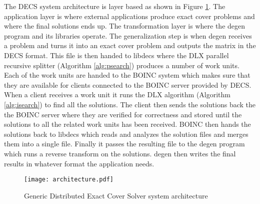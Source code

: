The DECS system architecture is layer based as shown in Figure \ref{fig:architecture}.
The application layer is where external applications produce exact cover problems and where the final solutions ends up.
The transformation layer is where the degen program and its libraries operate.
The generalization step is when degen receives a problem and turns it into an exact cover problem and outputs the matrix in the DECS format.
This file is then handed to libdecs where the DLX parallel recursive splitter (Algorithm \ref{alg:psearch}) produces a number of work units.
Each of the work units are handed to the BOINC system which makes sure that they are available for clients connected to the BOINC server provided by DECS.
When a client receives a work unit it runs the DLX algorithm (Algorithm \ref{alg:isearch}) to find all the solutions.
The client then sends the solutions back the the BOINC server where they are verified for correctness and stored until the solutions to all the related work units has been received.
BOINC then hands the solutions back to libdecs which reads and analyzes the solution files and merges them into a single file.
Finally it passes the resulting file to the degen program which runs a reverse transform on the solutions.
degen then writes the final results in whatever format the application needs.

\begin{figure}[htbp]
	\centering 
	\texttt{[image: architecture.pdf]}
	\caption{Generic Distributed Exact Cover Solver system architecture}
	\label{fig:architecture}
\end{figure}






